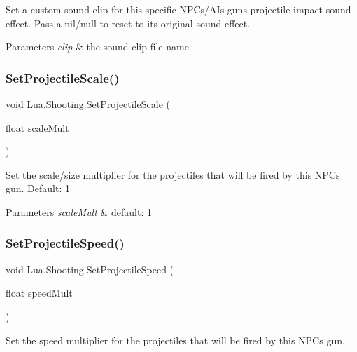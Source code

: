 Set a custom sound clip for this specific N\+P\+Cs/\+A\+Is gun\textquotesingle{}s projectile impact sound effect. Pass a nil/null to reset to its original sound effect. 


\begin{DoxyParams}{Parameters}
{\em clip} & the sound clip file name\\
\hline
\end{DoxyParams}
\mbox{\label{class_lua_1_1_shooting_a376edd82b6c42daab355831d5ecbc340}} 
\subsubsection{\texorpdfstring{SetProjectileScale()}{SetProjectileScale()}}
{\footnotesize\ttfamily void Lua.\+Shooting.\+Set\+Projectile\+Scale (\begin{DoxyParamCaption}\item[{float}]{scale\+Mult }\end{DoxyParamCaption})}



Set the scale/size multiplier for the projectiles that will be fired by this N\+PC\textquotesingle{}s gun. Default\+: 1 


\begin{DoxyParams}{Parameters}
{\em scale\+Mult} & default\+: 1\\
\hline
\end{DoxyParams}
\mbox{\label{class_lua_1_1_shooting_a916d6868d5ab051898ea2f7d676587aa}} 
\subsubsection{\texorpdfstring{SetProjectileSpeed()}{SetProjectileSpeed()}}
{\footnotesize\ttfamily void Lua.\+Shooting.\+Set\+Projectile\+Speed (\begin{DoxyParamCaption}\item[{float}]{speed\+Mult }\end{DoxyParamCaption})}



Set the speed multiplier for the projectiles that will be fired by this N\+PC\textquotesingle{}s gun. 


